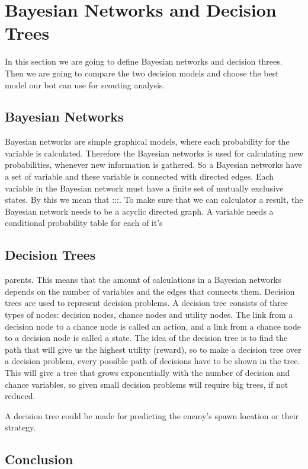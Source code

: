 \section{Bayesian Networks and Decision Trees}
In this section we are going to define Bayesian networks and decision threes. Then we are going to compare the two decision models and choose
the best model our bot can use for scouting analysis.

\subsection{Bayesian Networks}
	Bayesian networks are simple graphical models, where each probability for the variable is calculated. Therefore the Bayesian networks is used for
	calculating new probabilities, whenever new information is gathered. So a Bayesian networks have a  set of variable and
	these variable is connected with directed edges. Each variable in the Bayesian network must have a finite set of mutually exclusive states. By this we	
	mean that :::. To make sure that we can calculator a result, the Bayesian network needs to be a acyclic directed graph. A variable needs a conditional 		
	probability	table for each of it's

\subsection{Decision Trees} parents. This means that the amount of calculations in a Bayesian networks depends on the number of variables and the 		edges that connects them.
	Decision trees are used to represent decision problems. A decision tree consists of three types of nodes: decision nodes, chance nodes and utility nodes. 
	The link from a decision node to a chance node is called an action, and a link from a chance node to a decision node is called a state. 
	The idea of the decision tree is to find the path that will give us the highest utility (reward), so to make a decision tree over a decision problem, 
	every possible path of decisions have to be shown in the tree. This will give a tree that grows exponentially with the number of decision and 
	chance variables, so given small decision problems will require big trees, if not reduced. 
	
	A decision tree could be made for predicting the enemy's spawn location or their strategy. 
	
\subsection{Conclusion}
